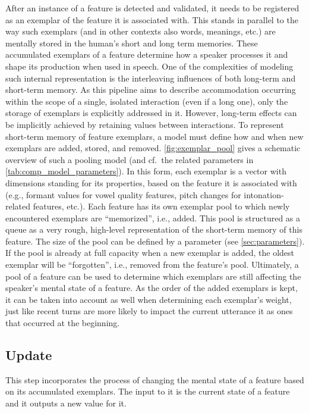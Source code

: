 After an instance of a feature is detected and validated, it needs to be registered as an exemplar of the feature it is associated with.
This stands in parallel to the way such exemplars (and in other contexts also words, meanings, etc.) are mentally stored in the human's short and long term memories.
These accumulated exemplars of a feature determine how a speaker processes it and shape its production when used in speech.
One of the complexities of modeling such internal representation is the interleaving influences of both long-term and short-term memory.
As this pipeline aims to describe accommodation occurring within the scope of a single, isolated interaction (even if a long one), only the storage of exemplars is explicitly addressed in it.
However, long-term effects can be implicitly achieved by retaining values between interactions.
To represent short-term memory of feature exemplars, a model must define how and when new exemplars are added, stored, and removed.
\cref{fig:exemplar_pool} gives a schematic overview of such a pooling model (and cf.\ the related parameters in \cref{tab:comp_model_parameters}).
In this form, each exemplar is a vector with dimensions standing for its properties, based on the feature it is associated with (e.g., formant values for vowel quality features, pitch changes for intonation-related features, etc.).
Each feature has its own exemplar pool to which newly encountered exemplars are \enquote{memorized}, i.e., added.
This pool is structured as a queue as a very rough, high-level representation of the short-term memory of this feature.
The size of the pool can be defined by a parameter (see \cref{sec:parameters}).
If the pool is already at full capacity when a new exemplar is added, the oldest exemplar will be \enquote{forgotten}, i.e., removed from the feature's pool.
Ultimately, a pool of a feature can be used to determine which exemplars are still affecting the speaker's mental state of a feature.
As the order of the added exemplars is kept, it can be taken into account as well when determining each exemplar's weight, just like recent turns are more likely to impact the current utterance it as ones that occurred at the beginning.

\subsection{Update}
\label{subsec:update}

This step incorporates the process of changing the mental state of a feature based on its accumulated exemplars.
The input to it is the current state of a feature and it outputs a new value for it.

